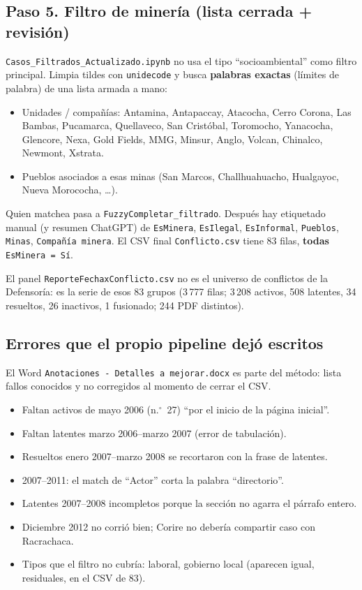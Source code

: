 \documentclass[11pt,a4paper]{article}
\begin{document}
\subsection{Paso 5. Filtro de minería (lista cerrada + revisión)}

\texttt{Casos\_Filtrados\_Actualizado.ipynb} no usa el tipo ``socioambiental'' como filtro principal. Limpia tildes con \texttt{unidecode} y busca \textbf{palabras exactas} (límites de palabra) de una lista armada a mano:

\begin{itemize}
  \item Unidades / compañías: Antamina, Antapaccay, Atacocha, Cerro Corona, Las Bambas, Pucamarca, Quellaveco, San Cristóbal, Toromocho, Yanacocha, Glencore, Nexa, Gold Fields, MMG, Minsur, Anglo, Volcan, Chinalco, Newmont, Xstrata.
  \item Pueblos asociados a esas minas (San Marcos, Challhuahuacho, Hualgayoc, Nueva Morococha, \ldots).
\end{itemize}

Quien matchea pasa a \texttt{FuzzyCompletar\_filtrado}. Después hay etiquetado manual (y resumen ChatGPT) de \texttt{EsMinera}, \texttt{EsIlegal}, \texttt{EsInformal}, \texttt{Pueblos}, \texttt{Minas}, \texttt{Compañía minera}. El CSV final \texttt{Conflicto.csv} tiene 83 filas, \textbf{todas} \texttt{EsMinera = Sí}.

El panel \texttt{ReporteFechaxConflicto.csv} no es el universo de conflictos de la Defensoría: es la serie de esos 83 grupos (3\,777 filas; 3\,208 activos, 508 latentes, 34 resueltos, 26 inactivos, 1 fusionado; 244 PDF distintos).

\subsection{Errores que el propio pipeline dejó escritos}

El Word \texttt{Anotaciones - Detalles a mejorar.docx} es parte del método: lista fallos conocidos y no corregidos al momento de cerrar el CSV.

\begin{itemize}
  \item Faltan activos de mayo 2006 (n.$^\circ$~27) ``por el inicio de la página inicial''.
  \item Faltan latentes marzo 2006--marzo 2007 (error de tabulación).
  \item Resueltos enero 2007--marzo 2008 se recortaron con la frase de latentes.
  \item 2007--2011: el match de ``Actor'' corta la palabra ``directorio''.
  \item Latentes 2007--2008 incompletos porque la sección no agarra el párrafo entero.
  \item Diciembre 2012 no corrió bien; Corire no debería compartir caso con Racrachaca.
  \item Tipos que el filtro no cubría: laboral, gobierno local (aparecen igual, residuales, en el CSV de 83).
\end{itemize}
\end{document}

